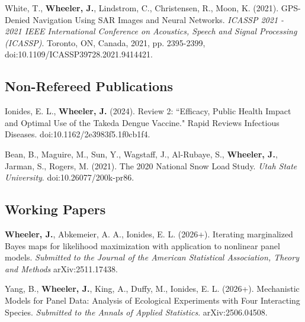 \documentclass[11pt]{article}
\newenvironment {reflist}
                {
                 \begin{list}{}
                 {\setlength{\labelwidth}{0mm}
                  \setlength{\leftmargin}{8mm}
                  \setlength{\itemindent}{-3mm}
                  \setlength{\labelsep}{0mm}
                  \setlength{\parsep}{0.1 ex}
                  \setlength{\itemsep}{0.1cm}
      \setlength{\topsep}{0.15cm}}} %
   {\end{list}}
\begin{document}
\begin{reflist}
    \item White, T., \textbf{Wheeler, J.}, Lindstrom, C., Christensen, R., Moon, K. (2021). GPS-Denied Navigation Using SAR Images and Neural Networks. {\it ICASSP 2021 - 2021 IEEE International Conference on Acoustics, Speech and Signal Processing (ICASSP)}. Toronto, ON, Canada, 2021, pp. 2395-2399, doi:10.1109/ICASSP39728.2021.9414421.

\end{reflist}

\subsection*{Non-Refereed Publications}

\begin{reflist}

    \item Ionides, E. L., \textbf{Wheeler, J.} (2024). Review 2: ``Efficacy, Public Health Impact and Optimal Use of the Takeda Dengue Vaccine." Rapid Reviews Infectious Diseases. doi:10.1162/2e3983f5.1f0cb1f4.

    \item Bean, B., Maguire, M., Sun, Y., Wagstaff, J., Al-Rubaye, S., \textbf{Wheeler, J.}, Jarman, S., Rogers, M. (2021). The 2020 National Snow Load Study. {\it Utah State University}. doi:10.26077/200k-pr86.


\end{reflist}

\subsection*{Working Papers}

\begin{reflist}

    \item \textbf{Wheeler, J.}, Abkemeier, A. A., Ionides, E. L. (2026+). Iterating marginalized Bayes maps for likelihood maximization with application to nonlinear panel models. {\it Submitted to the Journal of the American Statistical Association, Theory and Methods} arXiv:2511.17438.

    \item Yang, B., \textbf{Wheeler, J.}, King, A., Duffy, M., Ionides, E. L. (2026+). Mechanistic Models for Panel Data: Analysis of Ecological Experiments with Four Interacting Species. {\it Submitted to the Annals of Applied Statistics}. 	arXiv:2506.04508.


\end{reflist}
\end{document}
